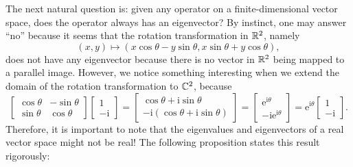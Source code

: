\documentclass[math]{amznotes}
\theoremstyle{remark}
\newcommand{\im}{\mathrm{i}}
\begin{document}
The next natural question is: given any operator on a finite-dimensional vector space, does the operator always has an eigenvector? By instinct, one may answer ``no'' because it seems that the rotation transformation in $\mathbb{R}^2$, namely
\begin{equation*}
    (x, y) \mapsto (x\cos\theta - y\sin\theta, x\sin\theta + y\cos\theta),
\end{equation*}
does not have any eigenvector because there is no vector in $\mathbb{R}^2$ being mapped to a parallel image. However, we notice something interesting when we extend the domain of the rotation transformation to $\mathbb{C}^2$, because
\begin{equation*}
    \begin{bmatrix}
        \cos\theta & -\sin\theta \\
        \sin\theta & \cos\theta
    \end{bmatrix}\begin{bmatrix}
        1 \\
        -\im
    \end{bmatrix} = \begin{bmatrix}
        \cos\theta + \im\sin\theta \\
        -\im(\cos\theta + \im\sin\theta)
    \end{bmatrix} = \begin{bmatrix}
        \mathrm{e}^{\im\theta} \\
        -\im\mathrm{e}^{\im\theta}
    \end{bmatrix} = \mathrm{e}^{\im\theta}\begin{bmatrix}
        1 \\
        -\im
    \end{bmatrix}.
\end{equation*}
Therefore, it is important to note that the eigenvalues and eigenvectors of a real vector space might not be real! The following proposition states this result rigorously:
\end{document}

